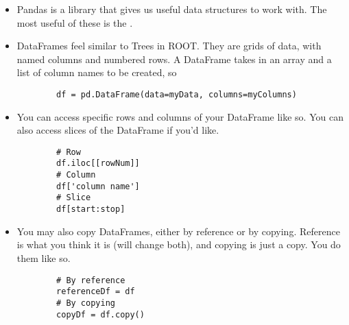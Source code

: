 \documentclass[11pt]{article}
\begin{document}
\begin{itemize}
    \item Pandas is a library that gives us useful data structures to work
    with. The most useful of these is the .
    \item DataFrames feel similar to Trees in ROOT. They are grids
    of data, with named columns and numbered rows. A DataFrame takes in an
    array and a list of column names to be created, so
    \begin{verbatim}
        df = pd.DataFrame(data=myData, columns=myColumns)
    \end{verbatim}
    \item You can access specific rows and columns of your DataFrame like
    so. You can also access slices of the DataFrame if you'd like.
    \begin{verbatim}
        # Row
        df.iloc[[rowNum]]
        # Column
        df['column name']
        # Slice
        df[start:stop]
    \end{verbatim}
    \item You may also copy DataFrames, either by reference or by copying.
    Reference is what you think it is (will change both), and copying is just a
    copy. You do them like so.
    \begin{verbatim}
        # By reference
        referenceDf = df
        # By copying
        copyDf = df.copy()
    \end{verbatim}
\end{itemize}
\end{document}
